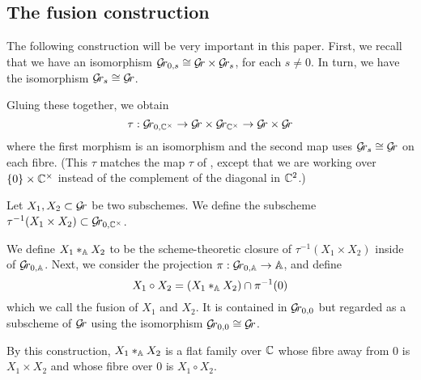 \documentclass[draft]{article}
\begin{document}
\subsection{The fusion construction}
The following construction will be very important in this paper.
First, we recall that we have an isomorphism $ \Gr_{0,s} \cong \Gr \times \Gr_s $, 
for each $ s \ne 0$.  In turn, we have the isomorphism $ \Gr_s \cong \Gr$.  

Gluing these together, we obtain
$$
\tau : \Gr_{0, \CC^\times} \rightarrow \Gr \times \Gr_{\CC^\times} \rightarrow \Gr \times \Gr
$$
where the first morphism is an isomorphism and the second map uses $ \Gr_s \cong \Gr $ on each fibre.  (This $\tau$ matches the map $ \tau $ of \cite{mirkovic2007geometric}, except that we are working over $ \{0 \} \times \CC^\times$ instead of the complement of the diagonal in $ \CC^2 $.)

Let $ X_1, X_2 \subset \Gr$ be two subschemes.
We define the subscheme $ \tau^{-1}(X_1 \times X_2) \subset \Gr_{0, \CC^\times} $.


We define $ X_1 \ast_{\AA} X_2 $ to be the scheme-theoretic closure of $  \tau^{-1}(X_1 \times X_2) $ inside of $ \Grbd $.  
Next, we consider the projection $ \pi: \Grbd \rightarrow \AA $, and define 
\begin{equation}
    \label{deservesdisplay}
    X_1 \circ X_2 = (X_1 \ast_\AA X_2) \cap \pi^{-1}(0) 
\end{equation}
which we call the fusion of $ X_1 $ and $X_2$. It is contained in $\Gr_{0,0}$ but regarded as a subscheme of $ \Gr $ using {the isomorphism} $\Gr_{0,0} \cong \Gr $. 

By this construction,  $X_1 \ast_{\AA} X_2 $ is a flat family over $\CC$ whose fibre away from $0$ is $X_1 \times X_2$ and whose fibre over $ 0$ is $ X_1 \circ X_2$.


\end{document}
